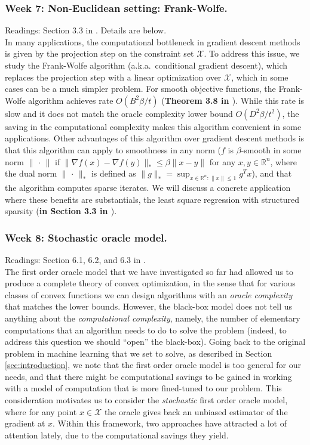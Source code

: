 \subsubsection*{Week 7: Non-Euclidean setting: Frank-Wolfe.}
Readings: Section 3.3 in \cite{bubeck}. Details are below.\\

In many applications, the computational bottleneck in gradient descent methods is given by the projection step on the constraint set $\mathcal{X}$. To address this issue, we study the Frank-Wolfe algorithm (a.k.a.\ conditional gradient descent), which replaces the projection step with a linear optimization over $\mathcal{X}$, which in some cases can be a much simpler problem. For smooth objective functions, the Frank-Wolfe algorithm achieves rate $O(B^2\beta/t)$ (\textbf{Theorem 3.8 in \cite{bubeck}}). While this rate is slow and it does not match the oracle complexity lower bound $O(D^2\beta/t^2)$, the saving in the computational complexity makes this algorithm convenient in some applications. Other advantages of this algorithm over gradient descent methods is that this algorithm can apply to smoothness in any norm ($f$ is $\beta$-smooth in some norm $\|\,\cdot\,\|$ if $\| \nabla f(x) - \nabla f(y) \|_* \le \beta \| x - y \| $ for any $x,y\in\mathbb{R}^n$, where the dual norm $\|\,\cdot\,\|_*$ is defined as $\|g\|_* = \sup_{x\in\mathbb{R}^n:\|x\|\le 1} g^Tx$), and that the algorithm computes sparse iterates. We will discuss a concrete application where these benefits are substantials, the least square regression with structured sparsity (\textbf{in Section 3.3 in \cite{bubeck}}).

\subsubsection*{Week 8: Stochastic oracle model.}
Readings: Section 6.1, 6.2, and 6.3 in \cite{bubeck}.\\

The first order oracle model that we have investigated so far had allowed us to produce a complete theory of convex optimization, in the sense that for various classes of convex functions we can design algorithms with an \emph{oracle complexity} that matches the lower bounds. However, the black-box model does not tell us anything about the \emph{computational complexity}, namely, the number of elementary computations that an algorithm needs to do to solve the problem (indeed, to address this question we should ``open'' the black-box). Going back to the original problem in machine learning that we set to solve, as described in Section \ref{sec:introduction}, we note that the first order oracle model is too general for our needs, and that there might be computational savings to be gained in working with a model of computation that is more fined-tuned to our problem. This consideration motivates us to consider the \emph{stochastic} first order oracle model, where for any point $x\in\mathcal{X}$ the oracle gives back an unbiased estimator of the gradient at $x$. Within this framework, two  approaches have attracted a lot of attention lately, due to the computational savings they yield.

